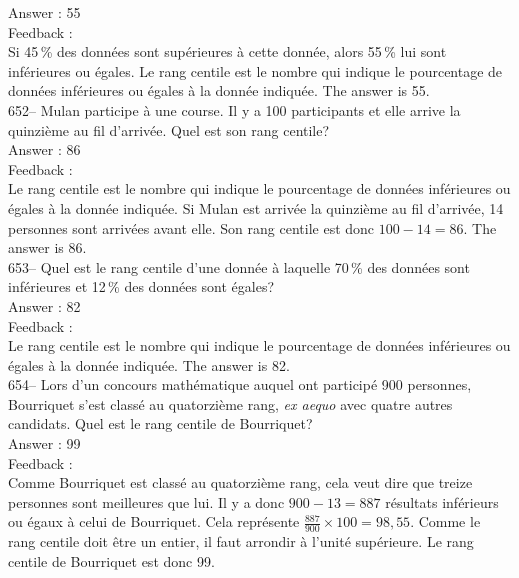 \documentclass[letterpaper, 12pt]{article}
\begin{document}
Answer : 55\\

Feedback : \\
Si 45\,\% des donn\'ees sont sup\'erieures \`a cette donn\'ee, alors 55\,\%
lui sont inf\'erieures ou \'egales.  Le rang centile est le nombre qui
indique le pourcentage de donn\'ees inf\'erieures ou \'egales \`a la
donn\'ee indiqu\'ee.  The answer is 55.\\

652-- Mulan participe \`a une course.  Il y a 100 participants et elle
arrive la quinzi\`eme au fil d'arriv\'ee.  Quel est son rang centile?\\

Answer : 86\\

Feedback : \\
Le rang centile est le nombre qui indique le pourcentage de donn\'ees
inf\'erieures ou \'egales \`a la donn\'ee indiqu\'ee.  Si Mulan est
arriv\'ee la quinzi\`eme au fil d'arriv\'ee, 14 personnes sont arriv\'ees
avant elle.  Son rang centile est donc $100-14=86$.  The answer is 86.\\

653-- Quel est le rang centile d'une donn\'ee \`a laquelle 70\,\% des
donn\'ees sont inf\'erieures et 12\,\% des donn\'ees sont \'egales?\\

Answer : 82\\

Feedback : \\
Le rang centile est le nombre qui indique le pourcentage de donn\'ees
inf\'erieures ou \'egales \`a la donn\'ee indiqu\'ee.  The answer is
82.\\

654--  Lors d'un concours math\'ematique auquel ont particip\'e 900
personnes, Bourriquet s'est class\'e au quatorzi\`eme rang, \emph{ex aequo}
avec quatre autres candidats.  Quel est le rang centile de Bourriquet?\\

Answer : 99\\

Feedback : \\
Comme Bourriquet est class\'e au quatorzi\`eme rang, cela veut dire que
treize personnes sont meilleures que lui.  Il y a donc $900-13=887$
r\'esultats inf\'erieurs ou \'egaux \`a celui de Bourriquet.  Cela
repr\'esente $\frac{887}{900}\times100=98,55$.  Comme le rang centile doit
\^etre un entier, il faut arrondir \`a l'unit\'e sup\'erieure.  Le rang
centile de Bourriquet est donc 99.\\
\end{document}
